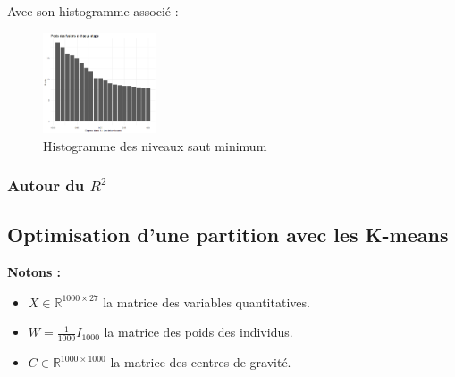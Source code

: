 \documentclass{article}
\begin{document}
Avec son histogramme associé :
\\
\begin{figure}[H]
    \centering
    \includegraphics[width=0.3\textwidth]{histomin4.png}
    \caption{Histogramme des niveaux saut minimum}
    \label{fig:histomin} 
\end{figure}


\newpage
\subsubsection{Autour du $R^2$}

\subsection{Optimisation d'une partition avec les K-means}

\par\textbf{Notons :}
\begin{itemize}
    \item $X \in \mathbb{R}^{1000\times 27}$ la matrice des variables quantitatives.    \item $W = \frac{1}{1000} I_{1000}$ la matrice des poids des individus.
    \item $C \in \mathbb{R}^{1000\times 1000}$ la matrice des centres de gravité.
\end{itemize}
\end{document}
